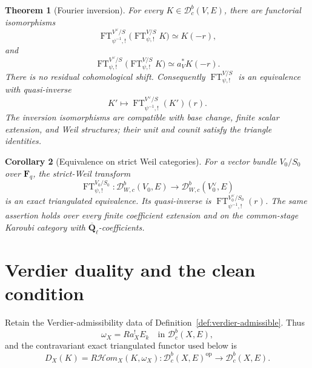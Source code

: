 \documentclass[10pt]{article}
\newtheorem{theorem}{Theorem}[section]
\newtheorem{corollary}[theorem]{Corollary}
\theoremstyle{definition}
\newcommand{\Fq}{\mathbf F_q}
\newcommand{\Qlb}{\overline{\mathbf Q}_\ell}
\newcommand{\Dbc}{\mathcal D^b_c}
\newcommand{\FT}{\operatorname{FT}}
\begin{document}
\begin{theorem}[Fourier inversion]
For every \(K\in\Dbc(V,E)\), there are functorial isomorphisms
\[
 \FT^{V^\vee/S}_{\psi^{-1},!}
 \bigl(\FT^{V/S}_{\psi,!}K\bigr)
 \simeq K(-r),
\]
and
\[
 \FT^{V^\vee/S}_{\psi,!}
 \bigl(\FT^{V/S}_{\psi,!}K\bigr)
 \simeq a_V^*K(-r).
\]
There is no residual cohomological shift.  Consequently
\(\FT^{V/S}_{\psi,!}\) is an equivalence with quasi-inverse
\[
 K'\longmapsto
 \FT^{V^\vee/S}_{\psi^{-1},!}(K')(r).
\]
The inversion isomorphisms are compatible with base change, finite scalar
extension, and Weil structures; their unit and counit satisfy the triangle
identities.
\end{theorem}

\begin{corollary}[Equivalence on strict Weil categories]
For a vector bundle \(V_0/S_0\) over \(\Fq\), the strict-Weil transform
\[
 \FT^{V_0/S_0}_{\psi,!}:\mathcal D^b_{W,c}(V_0,E)
 \longrightarrow\mathcal D^b_{W,c}(V_0^\vee,E)
\]
is an exact triangulated equivalence.  Its quasi-inverse is
\(\FT^{V_0^\vee/S_0}_{\psi^{-1},!}(r)\).  The same assertion holds over
every finite coefficient extension and on the common-stage Karoubi category
with \(\Qlb\)-coefficients.
\end{corollary}

\section{Verdier duality and the clean condition}

Retain the Verdier-admissibility data of
Definition~\ref{def:verdier-admissible}.  Thus
\[
 \omega_X=Ra_X^!E_k\quad\text{in }\Dbc(X,E),
\]
and the contravariant exact triangulated functor used below is
\[
 D_X(K)=R\mathcal Hom_X(K,\omega_X):
 \Dbc(X,E)^{\mathrm{op}}\longrightarrow\Dbc(X,E).
\]
\end{document}
